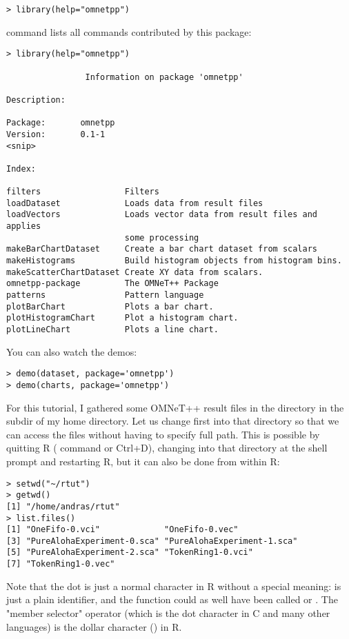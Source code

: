 \begin{verbatim}
> library(help="omnetpp")
\end{verbatim}

command lists all commands contributed by this package:

\begin{verbatim}
> library(help="omnetpp")

                Information on package 'omnetpp'

Description:

Package:       omnetpp
Version:       0.1-1
<snip>

Index:

filters                 Filters
loadDataset             Loads data from result files
loadVectors             Loads vector data from result files and applies
                        some processing
makeBarChartDataset     Create a bar chart dataset from scalars
makeHistograms          Build histogram objects from histogram bins.
makeScatterChartDataset Create XY data from scalars.
omnetpp-package         The OMNeT++ Package
patterns                Pattern language
plotBarChart            Plots a bar chart.
plotHistogramChart      Plot a histogram chart.
plotLineChart           Plots a line chart.
\end{verbatim}

You can also watch the demos:

\begin{verbatim}
> demo(dataset, package='omnetpp')
> demo(charts, package='omnetpp')
\end{verbatim}

For this tutorial, I gathered some OMNeT++ result files in the directory
in the  subdir of my home directory. Let us change first into that
directory so that we can access the files without having to specify
full path. This is possible by quitting R ( command or Ctrl+D),
changing into that directory at the shell prompt and restarting R,
but it can also be done from within R:

\begin{verbatim}
> setwd("~/rtut")
> getwd()
[1] "/home/andras/rtut"
> list.files()
[1] "OneFifo-0.vci"             "OneFifo-0.vec"
[3] "PureAlohaExperiment-0.sca" "PureAlohaExperiment-1.sca"
[5] "PureAlohaExperiment-2.sca" "TokenRing1-0.vci"
[7] "TokenRing1-0.vec"
\end{verbatim}

Note that the dot is just a normal character in R without a special meaning:
 is just a plain identifier, and the function could as well
have been called  or . The "member selector"
operator (which is the dot character in C and many other languages) is the
dollar character (\ttt{\$}) in R.


